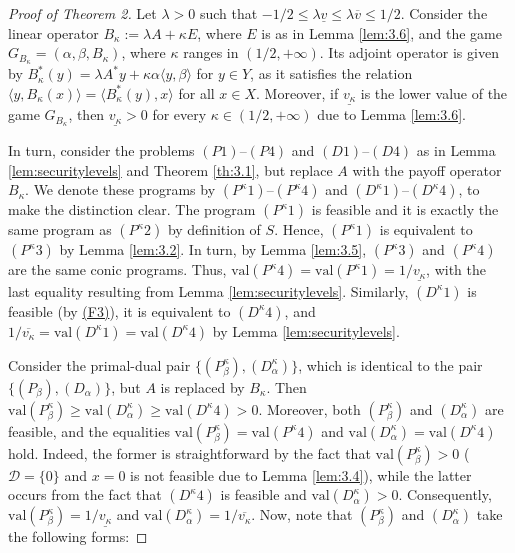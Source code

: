 \documentclass[11pt, twoside]{article}
\numberwithin{equation}{section}
\theoremstyle{definition}
\begin{document}
\begin{proof}[\textit{Proof of Theorem 2}] Let $\lambda>0$ such that $-1/2\leq\lambda\underline{v}\leq\lambda\overline{v}\leq 1/2$. Consider the linear operator $B_\kappa:=  \lambda A +\kappa E$, where $E$ is as in Lemma \ref{lem:3.6}, and the game $G_{B_\kappa}=(\alpha,\beta,B_\kappa)$, where $\kappa$ ranges in $(1/2,+\infty)$. Its adjoint operator is given by $B^*_\kappa(y)=\lambda A^*y+\kappa\alpha\langle y,\beta\rangle$ for $y\in Y$, as it satisfies the relation $\langle y,B_\kappa (x)\rangle=\langle B^*_\kappa (y),x\rangle$ for all $x\in X$. Moreover, if $\underline{v_\kappa}$ is the lower value of the game $G_{B_\kappa}$, then $\underline{v_\kappa}>0$ for every $\kappa\in(1/2,+\infty)$ due to Lemma \ref{lem:3.6}.\par

In turn, consider the problems \hyperlink{p1}{$(P1)$}--\hyperlink{p4}{$(P4)$} and \hyperlink{d1}{$(D1)$}--\hyperlink{d4}{$(D4)$} as in Lemma \ref{lem:securitylevels} and Theorem \ref{th:3.1}, but replace $A$ with the payoff operator $B_\kappa$. We denote these programs by $(P^\kappa 1)$--$(P^\kappa 4)$ and $(D^\kappa 1)$--$(D^\kappa 4)$, to make the distinction clear. The program $(P^\kappa 1)$ is feasible and it is exactly the same program as $(P^\kappa 2)$ by definition of $S$. Hence, $(P^\kappa 1)$ is equivalent to $(P^\kappa 3)$ by Lemma \ref{lem:3.2}. In turn, by Lemma \ref{lem:3.5}, $(P^\kappa 3)$ and $(P^\kappa 4)$ are the same conic programs. Thus, $\text{val}(P^\kappa 4)=\text{val}(P^\kappa 1)=1/{\underline{v_\kappa}}$, with the last equality resulting from Lemma \ref{lem:securitylevels}. Similarly, $(D^\kappa 1)$ is feasible (by \hyperlink{f3}{(F3)}), it is equivalent to $(D^\kappa 4)$, and $1/\overline{v_\kappa}=\text{val}(D^\kappa 1)=\text{val}(D^\kappa 4)$ by Lemma \ref{lem:securitylevels}.\par
 Consider the primal-dual pair $\{(P_\beta^\kappa),(D_\alpha^\kappa)\}$, which is identical to the pair \hyperlink{newprimaldual}{$\{(P_\beta),(D_\alpha)\}$}, but $A$ is replaced by $B_\kappa$. Then $\text{val}(P_\beta^\kappa)\geq \text{val}(D_\alpha^\kappa)\geq \text{val}(D^\kappa 4)>0$. Moreover, both $(P_\beta^\kappa)$ and $(D_\alpha^\kappa)$ are feasible, and the equalities $\text{val}(P_\beta^\kappa)=\text{val}(P^\kappa 4)$ and $\text{val}(D_\alpha^\kappa)=\text{val}(D^\kappa 4)$ hold. Indeed, the former is straightforward by the fact that $\text{val}(P_\beta^\kappa)>0$ ($\mathcal{D}=\{0\}$ and $x=0$ is not feasible due to Lemma \ref{lem:3.4}), while the latter occurs from the fact that $(D^\kappa 4)$ is feasible and $\text{val}(D^\kappa_\alpha)>0$. Consequently, $\text{val}(P^{\kappa}_\beta)=1/\underline{v_\kappa}$ and $\text{val}(D^{\kappa}_{\alpha})=1/\overline{v_\kappa}$. Now, note that $(P_\beta^\kappa)$ and $(D_\alpha^\kappa)$ take the following forms:

\end{proof}
\end{document}
